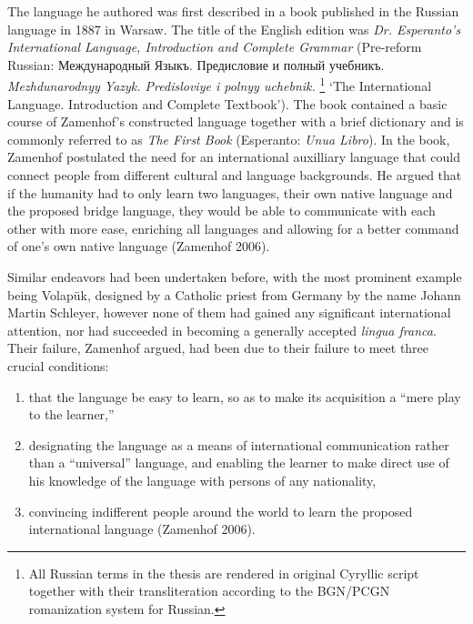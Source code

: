 The language he authored was first described in a book published in the Russian language in 1887 in Warsaw. The title of the English edition was \textit{Dr. Esperanto's International Language, Introduction and Complete Grammar} (Pre-reform Russian: Между\-на\-род\-ный Языкъ. Предисловие и полный учебникъ. \textit{Mezhdunarodnyy Yazyk. Predisloviye i polnyy uchebnik.}%
\footnote{All Russian terms in the thesis are rendered in original Cyryllic script together with their transliteration according to the BGN/PCGN romanization system for Russian.
}
`The International Language. Introduction and Complete Textbook').
The book contained a basic course of Zamenhof's constructed language together with a brief dictionary and is commonly referred to as \textit{The First Book} (Esperanto: \textit{Unua Libro}).
In the book, Zamenhof postulated the need for an international auxilliary language that could connect people from different cultural and language backgrounds.
He argued that if the humanity had to only learn two languages, their own native language and the proposed bridge language, they would be able to communicate with each other with more ease, enriching all languages and allowing for a better command of one's own native language (Zamenhof 2006).

Similar endeavors had been undertaken before, with the most prominent example being Volapük, designed by a Catholic priest from Germany by the name Johann Martin Schleyer, however none of them had gained any significant international attention, nor had succeeded in becoming a generally accepted \textit{lingua franca}.
Their failure, Zamenhof argued, had been due to their failure to meet three crucial conditions:

\begin{enumerate}
  \item that the language be easy to learn, so as to make its acquisition a ``mere play to the learner,''
  \item designating the language as a means of international communication rather than a ``universal'' language, and enabling the learner to make direct use of his knowledge of the language with persons of any nationality,
  \item convincing indifferent people around the world to learn the proposed international language (Zamenhof 2006).
\end{enumerate}


